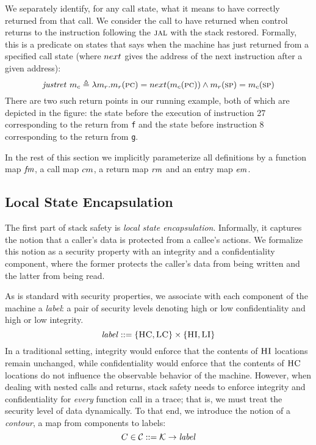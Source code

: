 \documentclass[acmsmall,review,anonymous]{acmart}\settopmatter{printfolios=true,printccs=false,printacmref=false}
\begin{document}
{We separately identify, for any call state, what it means to have 
correctly returned from that call. We consider the call to have
returned when control returns to the instruction following
the $\textsc{jal}$ with the stack restored. Formally, this is a predicate on
states that says when the machine has just returned from a specified call state
(where $next$ gives the address of the next instruction after a given address):
\[%
    \ret{\mach_c} \triangleq  \lambda \mach_r . \mach_r(\PCname) =
    \nextPC(\mach_c(\PCname)) \land  \mach_r(\SP) = \mach_c(\SP)
\]
There are two such return points in our running example, both of which
are depicted in the figure: the state before the execution of
instruction 27 corresponding to the return from {\tt f} and the state
before instruction 8 corresponding to the return from {\tt g}.

\medskip

In the rest of this section we implicitly parameterize all
definitions by a function map $\mathit{fm}$, a call map $cm$, a return
map $\mathit{rm}$ and an entry map $\mathit{em}$.

\subsection{Local State Encapsulation}
\label{sec:lse}

The first part of stack safety is {\em local state encapsulation}.
Informally, it captures the notion that a caller's data is
protected from a callee's actions. We formalize this notion
as a security property with an integrity and a confidentiality
component, where the former protects the caller's data from being
written and the latter from being read.

As is standard with security properties, we associate with each
component of the machine a {\em label}: a pair of security levels
denoting high or low confidentiality and high or low integrity.
%
\[\mathit{label} ::= \{\textsc{HC},\textsc{LC}\} \times \{\textsc{HI},\textsc{LI}\}\]
%
In a traditional setting, integrity would enforce that the contents of
$\textsc{HI}$ locations remain unchanged, while confidentiality would
enforce that the contents of $\textsc{HC}$ locations do not influence the
observable behavior of the machine. However, when dealing with nested
calls and returns, stack safety needs to enforce integrity and
confidentiality for {\em every} function call in a trace; that is, we
must treat the security level of data dynamically.
%
To that end, we introduce the notion of a {\em contour}, a map from
components to labels:
%
\[C \in {\mathcal C} ::= {\mathcal K} \rightarrow \mathit{label}\]

}
\end{document}
